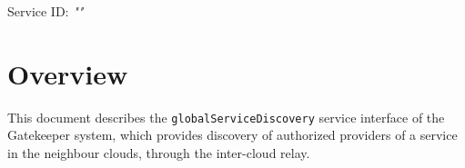 \documentclass[a4paper]{arrowhead}
\begin{document}
\sloppy

\ArrowheadSetup

\begin{center}
  \vspace*{1cm}
  \huge{\arrowtitle}

  \vspace*{0.2cm}
  \LARGE{\arrowtype}
  \vspace*{1cm}

  \Large{Service ID: \textit{"\arrowid"}}

  \vspace*{\fill}


  \vspace*{1cm}
  \vspace*{\fill}

  \begin{abstract}
    This document describes the HTTP/1.1 protocol with TLS payload security and JSON payload encoding variant of the \texttt{global\allowbreak{}Service\allowbreak{}Discovery} service of the Gatekeeper system.
  \end{abstract}

  \vspace*{1cm}
\end{center}

\newpage

\tableofcontents
\newpage

\section{Overview}
\label{sec:overview}

This document describes the \texttt{global\allowbreak{}Service\allowbreak{}Discovery} service interface of the Gatekeeper system, which provides discovery of authorized providers of a service in the neighbour clouds, through the inter-cloud relay.
\end{document}
